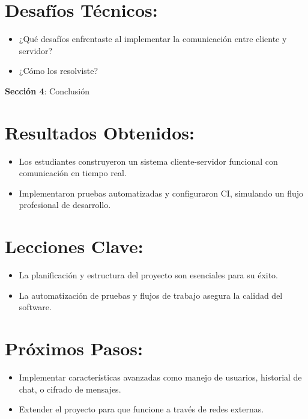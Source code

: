 \documentclass[
  a4paper,
  DIV=11,
  numbers=noendperiod,
  onepage,
  openany]{scrreprt}
\providecommand{\tightlist}{%
  \setlength{\itemsep}{0pt}\setlength{\parskip}{0pt}}\usepackage{longtable,booktabs,array}
\begin{document}
\section{Desafíos Técnicos:}\label{desafuxedos-tuxe9cnicos}

\begin{itemize}
\tightlist
\item
  ¿Qué desafíos enfrentaste al implementar la comunicación entre cliente
  y servidor?
\item
  ¿Cómo los resolviste?
\end{itemize}

\textbf{Sección 4}: Conclusión

\section{Resultados Obtenidos:}\label{resultados-obtenidos}

\begin{itemize}
\tightlist
\item
  Los estudiantes construyeron un sistema cliente-servidor funcional con
  comunicación en tiempo real.
\item
  Implementaron pruebas automatizadas y configuraron CI, simulando un
  flujo profesional de desarrollo.
\end{itemize}

\section{Lecciones Clave:}\label{lecciones-clave}

\begin{itemize}
\tightlist
\item
  La planificación y estructura del proyecto son esenciales para su
  éxito.
\item
  La automatización de pruebas y flujos de trabajo asegura la calidad
  del software.
\end{itemize}

\section{Próximos Pasos:}\label{pruxf3ximos-pasos}

\begin{itemize}
\tightlist
\item
  Implementar características avanzadas como manejo de usuarios,
  historial de chat, o cifrado de mensajes.
\item
  Extender el proyecto para que funcione a través de redes externas.
\end{itemize}
\end{document}
